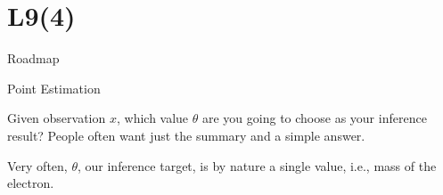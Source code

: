 \section{L9(4)}
\begin{frame}{Roadmap}

\plitemsep 0.15in

\bce[(1)]

\item {}

\item {}

\item {}

\item {}

\item {}


  
  \ece

\end{frame}



\begin{frame}{Point Estimation}

\vspace{-0.9cm}

\plitemsep 0.1in
\bci

\item<2-> 
\bci

\item   Given observation $x$, which  value $\theta$ are you
  going to choose as your inference result? People often want just the
  summary and a simple answer. 

\item Very often, $\theta$, our inference target, is by nature a
  single value, i.e., mass of the electron. 
  \eci


  \eci

\end{frame}



